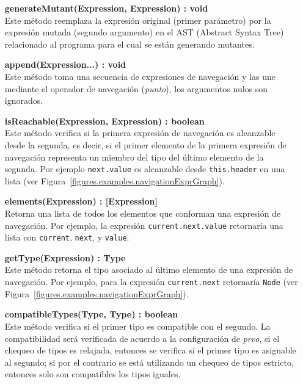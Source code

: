 \begin{enumerate}[leftmargin=.75cm,align=left]
	\item[\textbf{generateMutant(Expression, Expression) : void}]\mbox{}\\ Este m\'etodo reemplaza la expresi\'on original (primer par\'ametro) por la expresi\'on mutada (segundo argumento) en el AST (Abstract Syntax Tree) relacionado al programa para el cual se est\'an generando mutantes.
	
	\item[\textbf{append(Expression...) : void}]\mbox{}\\ Este m\'etodo toma una secuencia de expresiones de navegaci\'on y las une mediante el operador de navegaci\'on (\emph{punto}), los argumentos nulos son ignorados.
	
	\item[\textbf{isReachable(Expression, Expression) : boolean}]\mbox{}\\ Este m\'etodo verifica si la primera expresi\'on de navegaci\'on es alcanzable desde la segunda, es decir, si el primer elemento de la primera expresi\'on de navegaci\'on representa un miembro del tipo del \'ultimo elemento de la segunda. Por ejemplo \lstinline{next.value} es alcanzable desde \lstinline{this.header} en una lista (ver Figura~\ref{figures.examples.navigationExprGraph}).
	
	\item[\textbf{elements(Expression) : [Expression]}]\mbox{}\\ Retorna una lista de todos los elementos que conforman una expresi\'on de navegaci\'on. Por ejemplo, la expresi\'on \lstinline{current.next.value} retornar\'ia una lista con \lstinline{current}, \lstinline{next}, y \lstinline{value}.
	
	\item[\textbf{getType(Expression) : Type}]\mbox{}\\ Este m\'etodo retorna el tipo asociado al \'ultimo elemento de una expresi\'on de navegaci\'on. Por ejemplo, para la expresi\'on \lstinline{current.next} retornar\'ia \lstinline{Node} (ver Figura~\ref{figures.examples.navigationExprGraph}).
	
	\item[\textbf{compatibleTypes(Type, Type) : boolean}]\mbox{}\\ Este m\'etodo verifica si el primer tipo es compatible con el segundo. La compatibilidad ser\'a verificada de acuerdo a la configuraci\'on de \emph{prvo}, si el chequeo de tipos es relajada, entonces se verifica si el primer tipo es asignable al segundo; si por el contrario se est\'a utilizando un chequeo de tipos estricto, entonces solo son compatibles los tipos iguales.
	

\end{enumerate}
